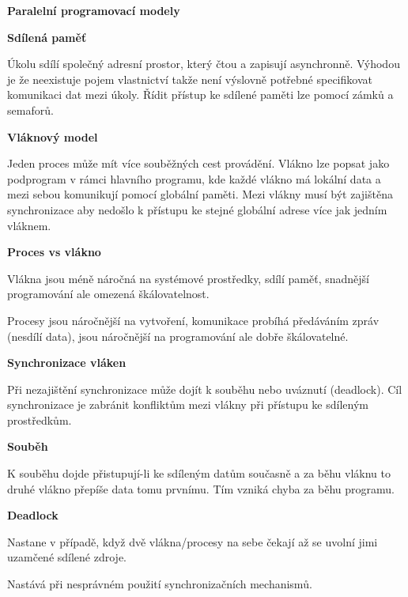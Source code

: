 \begin{Large}\vspace{0,5cm} \textbf{Paralelní
programovací modely}
\end{Large}

\begin{large}\vspace{0,5cm} \textbf{Sdílená paměť}
\end{large}

Úkolu sdílí společný adresní prostor, který čtou a zapisují asynchronně. Výhodou je že neexistuje pojem vlastnictví takže není výslovně potřebné specifikovat komunikaci dat mezi úkoly. Řídit přístup ke sdílené paměti lze pomocí zámků a semaforů.

\begin{large}\vspace{0,5cm} \textbf{Vláknový model}
\end{large}

Jeden proces může mít více souběžných cest provádění. Vlákno lze popsat jako podprogram v rámci hlavního programu, kde každé vlákno má lokální data a mezi sebou komunikují pomocí globální paměti. Mezi vlákny musí být zajištěna synchronizace aby nedošlo k přístupu ke stejné globální adrese více jak jedním vláknem.


\begin{Large}\vspace{0,5cm} \textbf{Proces vs vlákno}
\end{Large}

Vlákna jsou méně náročná na systémové prostředky, sdílí paměť, snadnější programování ale omezená škálovatelnost.

Procesy jsou náročnější na vytvoření, komunikace probíhá předáváním zpráv (nesdílí data), jsou náročnější na programování ale dobře škálovatelné.

\begin{Large}\vspace{0,5cm} \textbf{Synchronizace vláken}
\end{Large}

Při nezajištění synchronizace může dojít k souběhu nebo uváznutí (deadlock). Cíl synchronizace je zabránit konfliktům mezi vlákny při přístupu ke sdíleným prostředkům.

\begin{Large}\vspace{0,5cm} \textbf{Souběh}
\end{Large}

K souběhu dojde přistupují-li ke sdíleným datům současně a za běhu vláknu to druhé vlákno přepíše data tomu prvnímu. Tím vzniká chyba za běhu programu.


\begin{Large}\vspace{0,5cm} \textbf{Deadlock}
\end{Large}

Nastane v případě, když dvě vlákna/procesy na sebe čekají až se uvolní jimi uzamčené sdílené zdroje.

Nastává při nesprávném použití synchronizačních mechanismů.